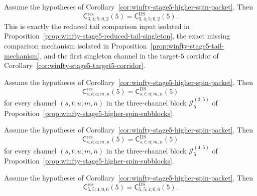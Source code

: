 \begin{conjecture}
\label{conj:winfty-stage5-block-34}
\ClaimStatusConjectured{}
Assume the hypotheses of
Corollary~\ref{cor:winfty-stage5-higher-spin-packet}.  Then
\[
\mathsf{C}^{\mathrm{res}}_{3,4;5;0,2}(5)
=
\mathsf{C}^{\mathrm{DS}}_{3,4;5;0,2}(5).
\]
This is exactly the reduced tail comparison input isolated in
Proposition~\ref{prop:winfty-stage5-reduced-tail-singleton}, the exact
missing comparison mechanism isolated in
Proposition~\ref{prop:winfty-stage5-tail-mechanism}, and the
first singleton channel in the target-$5$ corridor of
Corollary~\ref{cor:winfty-stage5-target5-corridor}.
\end{conjecture}

\begin{conjecture}
\label{conj:winfty-stage5-block-35}
\ClaimStatusConjectured{}
Assume the hypotheses of
Corollary~\ref{cor:winfty-stage5-higher-spin-packet}.  Then
\[
\mathsf{C}^{\mathrm{res}}_{s,t;u;m,n}(5)
=
\mathsf{C}^{\mathrm{DS}}_{s,t;u;m,n}(5)
\]
for every channel $(s,t;u;m,n)$ in the three-channel block
$\mathcal{J}_5^{(3,5)}$ of
Proposition~\ref{prop:winfty-stage5-higher-spin-subblocks}.
\end{conjecture}

\begin{conjecture}
\label{conj:winfty-stage5-block-45}
\ClaimStatusConjectured{}
Assume the hypotheses of
Corollary~\ref{cor:winfty-stage5-higher-spin-packet}.  Then
\[
\mathsf{C}^{\mathrm{res}}_{s,t;u;m,n}(5)
=
\mathsf{C}^{\mathrm{DS}}_{s,t;u;m,n}(5)
\]
for every channel $(s,t;u;m,n)$ in the three-channel block
$\mathcal{J}_5^{(4,5)}$ of
Proposition~\ref{prop:winfty-stage5-higher-spin-subblocks}.
\end{conjecture}

\begin{conjecture}
\label{conj:winfty-stage5-block-55}
\ClaimStatusConjectured{}
Assume the hypotheses of
Corollary~\ref{cor:winfty-stage5-higher-spin-packet}.  Then
\[
\mathsf{C}^{\mathrm{res}}_{5,5;4;0,6}(5)
=
\mathsf{C}^{\mathrm{DS}}_{5,5;4;0,6}(5).
\]
\end{conjecture}

